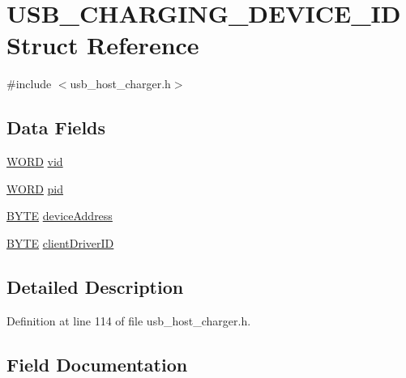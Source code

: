 \hypertarget{struct_u_s_b___c_h_a_r_g_i_n_g___d_e_v_i_c_e___i_d}{}\section{U\+S\+B\+\_\+\+C\+H\+A\+R\+G\+I\+N\+G\+\_\+\+D\+E\+V\+I\+C\+E\+\_\+\+I\+D Struct Reference}
\label{struct_u_s_b___c_h_a_r_g_i_n_g___d_e_v_i_c_e___i_d}


{\ttfamily \#include $<$usb\+\_\+host\+\_\+charger.\+h$>$}

\subsection*{Data Fields}
\begin{DoxyCompactItemize}
\item 
\hyperlink{_generic_type_defs_8h_a2b0e863dadf920709ec53d9088ee7c91}{W\+O\+R\+D} \hyperlink{struct_u_s_b___c_h_a_r_g_i_n_g___d_e_v_i_c_e___i_d_a9fcc011b7b6427b55322964f2d01781f}{vid}
\item 
\hyperlink{_generic_type_defs_8h_a2b0e863dadf920709ec53d9088ee7c91}{W\+O\+R\+D} \hyperlink{struct_u_s_b___c_h_a_r_g_i_n_g___d_e_v_i_c_e___i_d_a718a3b94d880d84d1532ae6411eb60cc}{pid}
\item 
\hyperlink{_generic_type_defs_8h_a4ae1dab0fb4b072a66584546209e7d58}{B\+Y\+T\+E} \hyperlink{struct_u_s_b___c_h_a_r_g_i_n_g___d_e_v_i_c_e___i_d_aa1d659071a17ee8d0172d34d6783b517}{device\+Address}
\item 
\hyperlink{_generic_type_defs_8h_a4ae1dab0fb4b072a66584546209e7d58}{B\+Y\+T\+E} \hyperlink{struct_u_s_b___c_h_a_r_g_i_n_g___d_e_v_i_c_e___i_d_a343912ad63712ea60903f5acd92efc9e}{client\+Driver\+I\+D}
\end{DoxyCompactItemize}


\subsection{Detailed Description}


Definition at line 114 of file usb\+\_\+host\+\_\+charger.\+h.



\subsection{Field Documentation}
\hypertarget{struct_u_s_b___c_h_a_r_g_i_n_g___d_e_v_i_c_e___i_d_a343912ad63712ea60903f5acd92efc9e}{}

